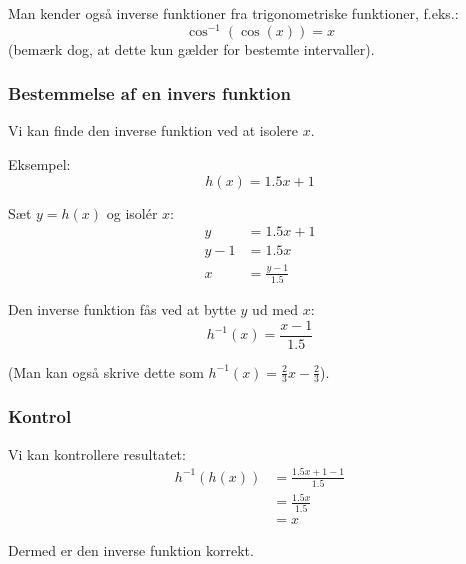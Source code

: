 Man kender også inverse funktioner fra trigonometriske funktioner, f.eks.:
\begin{equation*}
    \cos^{-1}(\cos(x)) = x
\end{equation*}
(bemærk dog, at dette kun gælder for bestemte intervaller).

\subsubsection*{Bestemmelse af en invers funktion}
Vi kan finde den inverse funktion ved at isolere $x$.

Eksempel:
\begin{equation*}
    h(x) = 1.5x + 1
\end{equation*}

Sæt $y = h(x)$ og isolér $x$:
\begin{align*}
    y &= 1.5x + 1 \\
    y - 1 &= 1.5x \\
    x &= \frac{y - 1}{1.5}
\end{align*}

Den inverse funktion fås ved at bytte $y$ ud med $x$:
\begin{equation*}
    h^{-1}(x) = \frac{x - 1}{1.5}
\end{equation*}

(Man kan også skrive dette som $h^{-1}(x) = \frac{2}{3}x - \frac{2}{3}$).

\subsubsection*{Kontrol}
Vi kan kontrollere resultatet:
\begin{align*}
    h^{-1}(h(x)) &= \frac{1.5x + 1 - 1}{1.5} \\
                 &= \frac{1.5x}{1.5} \\
                 &= x
\end{align*}

Dermed er den inverse funktion korrekt.